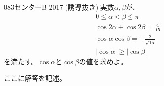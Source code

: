 \begin{thm}{083}{}{センターB 2017 (誘導抜き)}
 実数$\alpha, \beta$が、
 \begin{align*}
  0\le \alpha < \beta \le \pi \\
  \cos 2\alpha + \cos 2\beta = \frac{4}{15} \\
  \cos\alpha \cos\beta = -\frac{2}{\sqrt{15}} \\
  \left|\cos\alpha\right| \ge  \left|\cos\beta\right|
 \end{align*}
 を満たす。$\cos\alpha$と$\cos\beta$の値を求めよ。
\end{thm}

ここに解答を記述。
